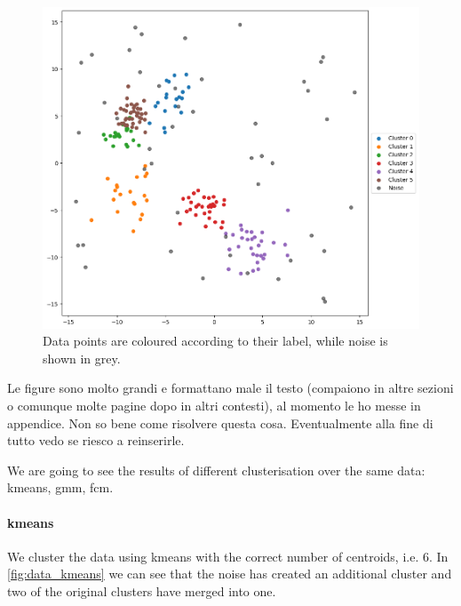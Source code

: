 \begin{figure}[ht]
    \centering
    \includegraphics[width=0.9\linewidth]{Figures/dati_veri.png}
    \caption[example of data for clustering]{Data points are coloured according to their label, while noise is shown in grey.}
    \label{fig:data_true}
\end{figure}

\begin{toDo}
	Le figure sono molto grandi e formattano male il testo (compaiono in altre sezioni o comunque molte pagine dopo in altri contesti), al momento le ho messe in appendice. Non so bene come risolvere questa cosa. Eventualmente alla fine di tutto vedo se riesco a reinserirle.
\end{toDo}

\begin{toReview}
	We are going to see the results of different clusterisation over the same data: \gls{kmeans}, \gls{gmm}, \gls{fcm}.
\end{toReview}
\paragraph{\gls{kmeans}} We cluster the data using \gls{kmeans} with the correct number of centroids, i.e. $6$. In \cref{fig:data_kmeans} we can see that the noise has created an additional cluster and two of the original clusters have merged into one.

